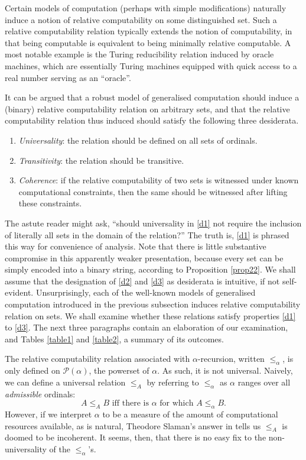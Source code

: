 \documentclass[12pt]{article}
\numberwithin{equation}{section}
\begin{document}
Certain models of computation (perhaps with simple modifications) naturally induce a notion of relative computability on some distinguished set. Such a relative computability relation typically extends the notion of computability, in that being computable is equivalent to being minimally relative computable. A most notable example is the Turing reducibility relation induced by oracle machines, which are essentially Turing machines equipped with quick access to a real number serving as an ``oracle''. 

It can be argued that a robust model of generalised computation should induce a (binary) relative computability relation on arbitrary sets, and that the relative computability relation thus induced should satisfy the following three desiderata.
\begin{enumerate}[leftmargin=40pt, label=(D\arabic*)]
    \item\label{d1} \textit{Universality}: the relation should be defined on all sets of ordinals.
    \item\label{d2} \textit{Transitivity}: the relation should be transitive.
    \item\label{d3} \textit{Coherence}: if the relative computability of two sets is witnessed under known computational constraints, then the same should be witnessed after lifting these constraints.
\end{enumerate}
The astute reader might ask, ``should universality in \ref{d1} not require the inclusion of literally all sets in the domain of the relation?'' The truth is, \ref{d1} is phrased this way for convenience of analysis. Note that there is little substantive compromise in this apparently weaker presentation, because every set can be simply encoded into a binary string, according to Proposition \ref{prop22}. We shall assume that the designation of \ref{d2} and \ref{d3} as desiderata is intuitive, if not self-evident. Unsurprisingly, each of the well-known models of generalised computation introduced in the previous subsection induces relative computability relation on sets. We shall examine whether these relations satisfy properties \ref{d1} to \ref{d3}. The next three paragraphs contain an elaboration of our examination, and Tables \ref{table1} and \ref{table2}, a summary of its outcomes.

The relative computability relation associated with $\alpha$-recursion, written $\leq_{\alpha}$, is only defined on $\mathcal{P}(\alpha)$, the powerset of $\alpha$. As such, it is not universal. Naively, we can define a universal relation $\leq_A$ by referring to $\leq_{\alpha}$ as $\alpha$ ranges over all \textit{admissible} ordinals: $$A \leq_A B \text{ iff there is } \alpha \text{ for which } A \leq_{\alpha} B \text{.}$$ However, if we interpret $\alpha$ to be a measure of the amount of computational resources available, as is natural, Theodore Slaman's answer in \cite{slaman} tells us $\leq_A$ is doomed to be incoherent. It seems, then, that there is no easy fix to the non-universality of the $\leq_{\alpha}$'s.
\end{document}
